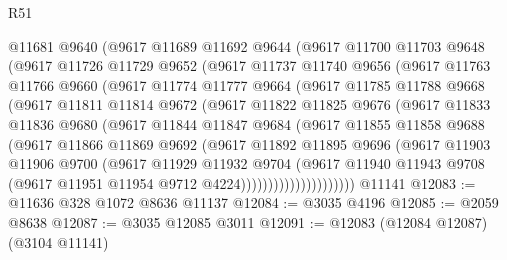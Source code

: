 \begin{lexlean}{R51}
\begin{coremodule}
          @11681
          @9640
          (@9617
            @11689
            @11692
            @9644
            (@9617
              @11700
              @11703
              @9648
              (@9617
                @11726
                @11729
                @9652
                (@9617
                  @11737
                  @11740
                  @9656
                  (@9617
                    @11763
                    @11766
                    @9660
                    (@9617
                      @11774
                      @11777
                      @9664
                      (@9617
                        @11785
                        @11788
                        @9668
                        (@9617
                          @11811
                          @11814
                          @9672
                          (@9617
                            @11822
                            @11825
                            @9676
                            (@9617
                              @11833
                              @11836
                              @9680
                              (@9617
                                @11844
                                @11847
                                @9684
                                (@9617
                                  @11855
                                  @11858
                                  @9688
                                  (@9617
                                    @11866
                                    @11869
                                    @9692
                                    (@9617
                                      @11892
                                      @11895
                                      @9696
                                      (@9617
                                        @11903
                                        @11906
                                        @9700
                                        (@9617
                                          @11929
                                          @11932
                                          @9704
                                          (@9617
                                            @11940
                                            @11943
                                            @9708
                                            (@9617 @11951 @11954 @9712 @4224)))))))))))))))))))))
    @11141
@12083 := @11636 @328 @1072 @8636 @11137
@12084 := @3035 @4196
@12085 := @2059 @8638
@12087 := @3035 @12085 @3011
@12091 := @12083 (@12084 @12087) (@3104 @11141)

\end{coremodule}
\end{lexlean}
